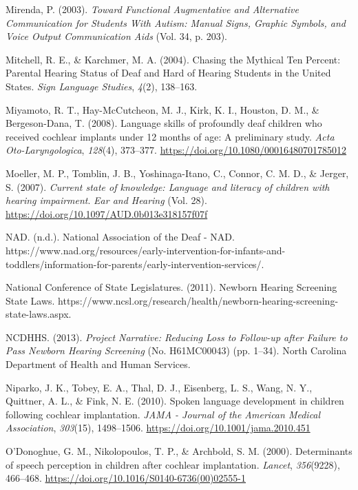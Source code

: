 \documentclass[english,man]{apa6}
\begin{document}
\leavevmode\hypertarget{ref-mirenda2003}{}%
Mirenda, P. (2003). \emph{Toward Functional Augmentative and Alternative Communication for Students With Autism: Manual Signs, Graphic Symbols, and Voice Output Communication Aids} (Vol. 34, p. 203).

\leavevmode\hypertarget{ref-mitchell2004}{}%
Mitchell, R. E., \& Karchmer, M. A. (2004). Chasing the Mythical Ten Percent: Parental Hearing Status of Deaf and Hard of Hearing Students in the United States. \emph{Sign Language Studies}, \emph{4}(2), 138--163.

\leavevmode\hypertarget{ref-miyamoto2008}{}%
Miyamoto, R. T., Hay-McCutcheon, M. J., Kirk, K. I., Houston, D. M., \& Bergeson-Dana, T. (2008). Language skills of profoundly deaf children who received cochlear implants under 12 months of age: A preliminary study. \emph{Acta Oto-Laryngologica}, \emph{128}(4), 373--377. \url{https://doi.org/10.1080/00016480701785012}

\leavevmode\hypertarget{ref-moeller2007}{}%
Moeller, M. P., Tomblin, J. B., Yoshinaga-Itano, C., Connor, C. M. D., \& Jerger, S. (2007). \emph{Current state of knowledge: Language and literacy of children with hearing impairment}. \emph{Ear and Hearing} (Vol. 28). \url{https://doi.org/10.1097/AUD.0b013e318157f07f}

\leavevmode\hypertarget{ref-nad}{}%
NAD. (n.d.). National Association of the Deaf - NAD. https://www.nad.org/resources/early-intervention-for-infants-and-toddlers/information-for-parents/early-intervention-services/.

\leavevmode\hypertarget{ref-nationalconferenceofstatelegislatures2011}{}%
National Conference of State Legislatures. (2011). Newborn Hearing Screening State Laws. https://www.ncsl.org/research/health/newborn-hearing-screening-state-laws.aspx.

\leavevmode\hypertarget{ref-ncdhhs2013}{}%
NCDHHS. (2013). \emph{Project Narrative: Reducing Loss to Follow-up after Failure to Pass Newborn Hearing Screening} (No. H61MC00043) (pp. 1--34). North Carolina Department of Health and Human Services.

\leavevmode\hypertarget{ref-niparko2010}{}%
Niparko, J. K., Tobey, E. A., Thal, D. J., Eisenberg, L. S., Wang, N. Y., Quittner, A. L., \& Fink, N. E. (2010). Spoken language development in children following cochlear implantation. \emph{JAMA - Journal of the American Medical Association}, \emph{303}(15), 1498--1506. \url{https://doi.org/10.1001/jama.2010.451}

\leavevmode\hypertarget{ref-odonoghue2000}{}%
O'Donoghue, G. M., Nikolopoulos, T. P., \& Archbold, S. M. (2000). Determinants of speech perception in children after cochlear implantation. \emph{Lancet}, \emph{356}(9228), 466--468. \url{https://doi.org/10.1016/S0140-6736(00)02555-1}
\end{document}
